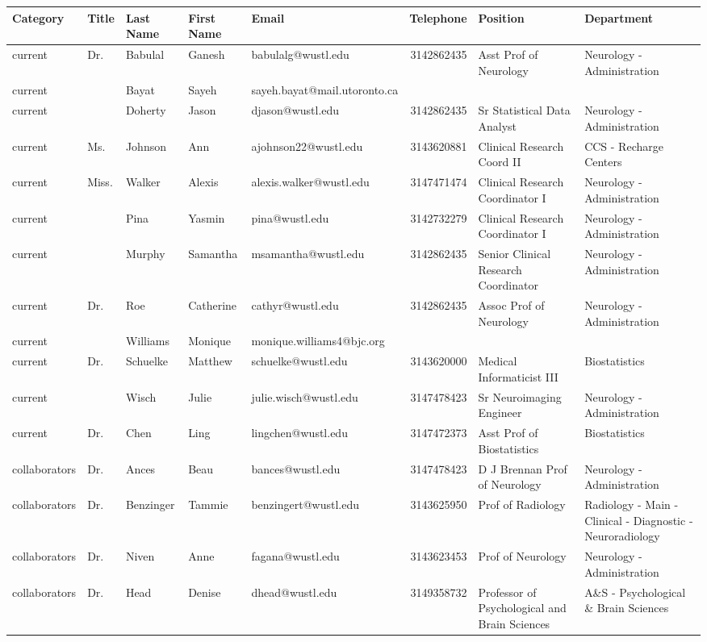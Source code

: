 \documentclass[
]{book}
\begin{document}
\begin{table}
\centering\begingroup\fontsize{9}{11}\selectfont

\begin{tabular}{l|l|l|l|l|r|l|l}
\hline
Category & Title & Last Name & First Name & Email & Telephone & Position & Department\\
\hline
current & Dr. & Babulal & Ganesh & babulalg@wustl.edu & 3142862435 & Asst Prof of Neurology & Neurology - Administration\\
\hline
current &  & Bayat & Sayeh & sayeh.bayat@mail.utoronto.ca &  &  & \\
\hline
current &  & Doherty & Jason & djason@wustl.edu & 3142862435 & Sr Statistical Data Analyst & Neurology - Administration\\
\hline
current & Ms. & Johnson & Ann & ajohnson22@wustl.edu & 3143620881 & Clinical Research Coord II & CCS - Recharge Centers\\
\hline
current & Miss. & Walker & Alexis & alexis.walker@wustl.edu & 3147471474 & Clinical Research Coordinator I & Neurology - Administration\\
\hline
current &  & Pina & Yasmin & pina@wustl.edu & 3142732279 & Clinical Research Coordinator I & Neurology - Administration\\
\hline
current &  & Murphy & Samantha & msamantha@wustl.edu & 3142862435 & Senior Clinical Research Coordinator & Neurology - Administration\\
\hline
current & Dr. & Roe & Catherine & cathyr@wustl.edu & 3142862435 & Assoc Prof of Neurology & Neurology - Administration\\
\hline
current &  & Williams & Monique & monique.williams4@bjc.org &  &  & \\
\hline
current & Dr. & Schuelke & Matthew & schuelke@wustl.edu & 3143620000 & Medical Informaticist III & Biostatistics\\
\hline
current &  & Wisch & Julie & julie.wisch@wustl.edu & 3147478423 & Sr Neuroimaging Engineer & Neurology - Administration\\
\hline
current & Dr. & Chen & Ling & lingchen@wustl.edu & 3147472373 & Asst Prof of Biostatistics & Biostatistics\\
\hline
collaborators & Dr. & Ances & Beau & bances@wustl.edu & 3147478423 & D J Brennan Prof of Neurology & Neurology - Administration\\
\hline
collaborators & Dr. & Benzinger & Tammie & benzingert@wustl.edu & 3143625950 & Prof of Radiology & Radiology - Main - Clinical - Diagnostic - Neuroradiology\\
\hline
collaborators & Dr. & Niven & Anne & fagana@wustl.edu & 3143623453 & Prof of Neurology & Neurology - Administration\\
\hline
collaborators & Dr. & Head & Denise & dhead@wustl.edu & 3149358732 & Professor of Psychological and Brain Sciences & A\&S - Psychological \& Brain Sciences\\
\hline
\end{tabular}
\endgroup{}
\end{table}
\end{document}
